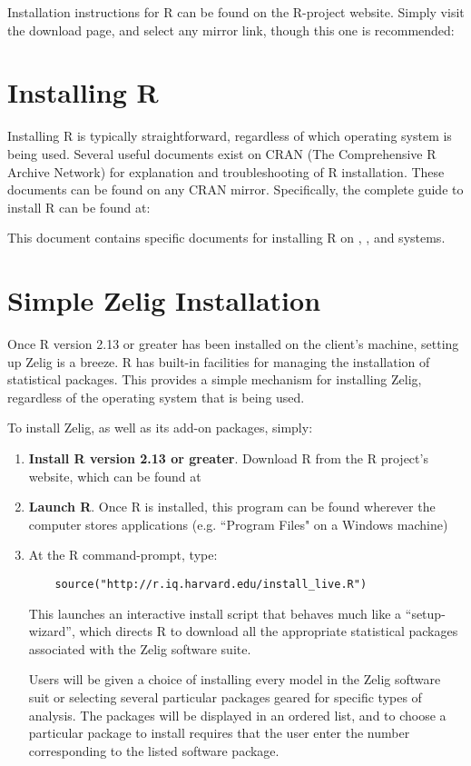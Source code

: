 Installation instructions for R can be found on the R-project website. Simply visit the download page, and select any mirror link, though this one is recommended:

\CranMirror



%
%
\section{Installing R}

Installing R is typically straightforward, regardless of which operating system is being used. Several useful documents exist on CRAN (The Comprehensive R Archive Network) for explanation and troubleshooting of R installation. These documents can be found on any CRAN mirror. Specifically, the complete guide to install R can be found at:

\InstallInstructionsHref

This document contains specific documents for installing R on \MacInstallHref, \WindowsInstallHref, and \UnixInstallHref systems.

%
%
\section{Simple Zelig Installation}

Once R version 2.13 or greater has been installed on the client's machine, setting up Zelig is a breeze. R has built-in facilities for managing the installation of statistical packages. This provides a simple mechanism for installing Zelig, regardless of the operating system that is being used.

To install Zelig, as well as its add-on packages, simply:

\begin{enumerate}
	\item {\bf Install R version 2.13 or greater}. Download R from the R project's website, which can be found at \CranMirror
  \item {\bf Launch R}. Once R is installed, this program can be found wherever the computer stores applications (e.g. ``Program Files" on a Windows machine)
  \item At the R command-prompt, type:
    \begin{verbatim}
    source("http://r.iq.harvard.edu/install_live.R")
    \end{verbatim}
    This launches an interactive install script that behaves much like a  ``setup-wizard'', which directs R to download all the appropriate statistical packages associated with the Zelig software suite. 

    Users will be given a choice of installing every model in the Zelig software suit or selecting several particular packages geared for specific types of analysis. The packages will be displayed in an ordered list, and to choose
    a particular package to install requires that the user enter the number corresponding to the listed software package.
\end{enumerate}






